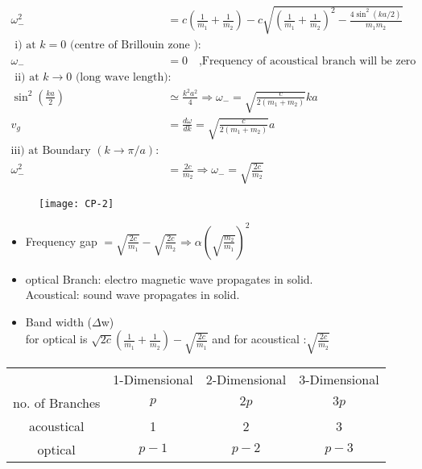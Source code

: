 \begin{align*}
\omega_{-}^{2}&=c\left(\frac{1}{m_{1}}+\frac{1}{m_{2}}\right)-c \sqrt{\left(\frac{1}{m_{1}}+\frac{1}{m_{2}}\right)^{2}-\frac{4 \sin ^{2}(k a / 2)}{m_{1} m_{2}}}\\
\text { i) at } k=0 \text { (centre of Brillouin zone}  \text { ): }&\\
\omega_{-}&=0 \quad \text{,Frequency of acoustical branch will be zero}\\
\text { ii) at } k \rightarrow 0 \text { (long wave length): }&\\
\sin ^{2}\left(\frac{k a}{2}\right) &\simeq \frac{k^{2} a^{2}}{4} \Rightarrow \omega_{-}=\sqrt{\frac{c}{2\left(m_{1}+m_{2}\right)}} k a\\
v_{g}&=\frac{d\omega}{d k}=\sqrt{\frac{c}{2\left(m_{1}+m_{2}\right)}} a\\
\text{iii) at Boundary }(k \rightarrow \pi / a):&\\
\omega_{-}^{2}&=\frac{2 c}{m_{2}} \Rightarrow \omega_{-}=\sqrt{\frac{2 c}{m_{2}}}
\end{align*}
\begin{figure}[H]
	\centering
	\texttt{[image: CP-2]}
\end{figure}
\begin{itemize}
	\item Frequency gap $=\sqrt{\frac{2 c}{m_{1}}}-\sqrt{\frac{2 c}{m_{2}}} \Rightarrow \alpha\left(\sqrt{\frac{m_{2}}{m_{1}}}\right)^{2}$
	\item optical Branch: electro magnetic wave propagates in solid.\\ Acoustical: sound wave propagates in solid.
	\item Band width ($\Delta$w)\\
	for optical is
$	\sqrt{2 c}\left(\frac{1}{m_{1}}+\frac{1}{m_{2}}\right)-\sqrt{\frac{2 c}{m_{1}}}$
	  and for acoustical :$\sqrt{\frac{2 c}{m_{2}}} $
\end{itemize}
\renewcommand*{\arraystretch}{1.5}
\begin{tabular}{|c|c|c|c|} 
	\hline
	& 1-Dimensional & 2-Dimensional& 3-Dimensional \\
	\cline { 2 - 4 } no. of Branches & $p$ & $2 p$ & $3 p$ \\
	\hline acoustical & 1 & 2 & 3 \\
	\hline optical & $p-1$ & $p-2$ & $p-3$\\
	\hline
\end{tabular}

